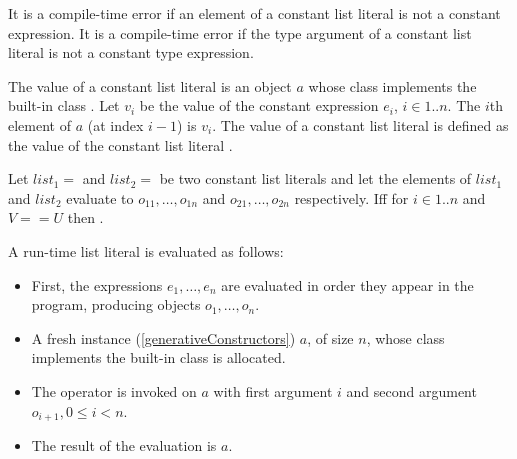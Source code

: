 \documentclass[makeidx]{article}
\begin{document}
{

\LMHash{}%
It is a compile-time error if an element of a constant list literal
is not a constant expression.
It is a compile-time error if the type argument of a constant list literal
is not a constant type expression.


\LMHash{}%
The value of a constant list literal
is an object $a$ whose class implements the built-in class
.
Let $v_i$ be the value of the constant expression $e_i$, $i \in 1 .. n$.
The $i$th element of $a$ (at index $i - 1$) is $v_i$.
%
The value of a constant list literal
is defined as the value of the constant list literal
\code{\CONST\,\,<\DYNAMIC>[$e_1, \ldots, e_n$]}.

\LMHash{}%
Let
$list_1 =$ 
and
$list_2 =$ 
be two constant list literals and
let the elements of $list_1$ and $list_2$ evaluate to
$o_{11}, \ldots, o_{1n}$ and $o_{21}, \ldots, o_{2n}$ respectively.
If{}f  for $i \in 1 .. n$ and $V == U$
then .


\LMHash{}%
A run-time list literal
is evaluated as follows:
\begin{itemize}
\item
  First, the expressions $e_1, \ldots, e_n$ are evaluated
  in order they appear in the program,
  producing objects $o_1, \ldots, o_n$.
\item
  A fresh instance (\ref{generativeConstructors}) $a$, of size $n$,
  whose class implements the built-in class 
  is allocated.
\item
  The operator \lit{[]=} is invoked on $a$ with
  first argument $i$ and second argument
  $o_{i+1}, 0 \le i < n$.
\item
  The result of the evaluation is $a$.
\end{itemize}

}
\end{document}
